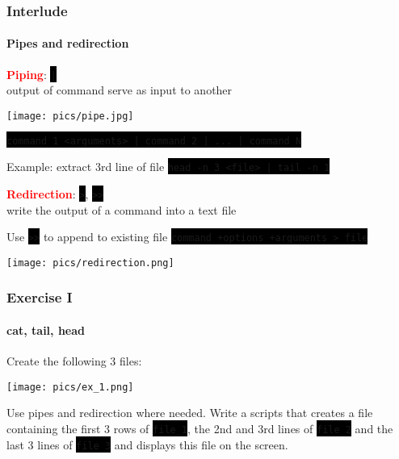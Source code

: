 \documentclass[unknownkeysallowed, 10pt, a4 paper, handout]{beamer}
\newcommand{\focus}[1]{\textbf{\textcolor{red}{#1}}}
\newcommand{\code}[1]{\colorbox{black}{\color{green}\texttt{#1}}}
\newcommand{\sidebyside}[5]{
  \begin{minipage}{#1\textwidth}
    #2
  \end{minipage} #3 \begin{minipage}{#4\textwidth}
    #5
  \end{minipage}
}
\begin{document}
\begin{frame}
  \frametitle{Interlude}
  \framesubtitle{Pipes and redirection}

  \sidebyside{0.56}{
    \focus{Piping}: \code{|} \\
    output of command serve as input to another
  }{\hfill}{0.40}{
    \begin{center}
      \texttt{[image: pics/pipe.jpg]}
    \end{center}
  }

  \begin{block}{}
  \code{command\_1 <arguments> | command\_2 | ... | command\_N}
  \end{block}

  \begin{exampleblock}{Example: extract 3rd line of file}
  \code{head -n 3 <file> | tail -n 1}
  \end{exampleblock}

  \sidebyside{0.68}{
      \focus{Redirection}: \code{>}, \code{>>} \\
    write the output of a command into a text file

    \begin{exampleblock}{Use \code{>>} to append to existing file}
    \code{command +options +arguments > file}
    \end{exampleblock}
  }{\hfill}{0.30}{
    \begin{center}
      \texttt{[image: pics/redirection.png]}
    \end{center}
    }
\end{frame}


\begin{frame}
  \frametitle{Exercise I}
  \framesubtitle{cat, tail, head}

  \sidebyside{0.40}{
    Create the following 3 files:
  }{\hfill}{0.50}{
    \begin{center}
      \texttt{[image: pics/ex\_1.png]}
    \end{center}
  }

  \begin{exampleblock}{Use pipes and redirection where needed.}
    Write a scripts that creates a file containing the first 3 rows of
    \code{file\_1}, the 2nd and 3rd lines of \code{file\_2} and the last 3
    lines of \code{file\_3} and displays this file on the screen.
  \end{exampleblock}
\end{frame}
\end{document}
